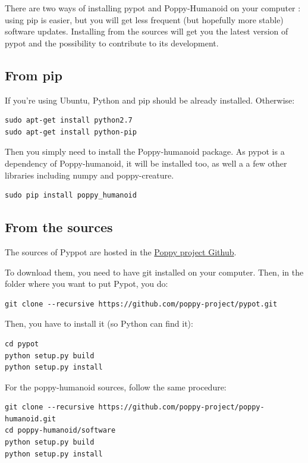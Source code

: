 \documentclass{article}
\begin{document}
There are two ways of installing pypot and Poppy-Humanoid on your computer : using pip is easier, but you will get less frequent (but hopefully more stable) software updates. Installing from the sources will get you the latest version of pypot and the possibility to contribute to its development.

\subsection{From pip}
If you're using Ubuntu, Python and pip should be already installed. Otherwise:
\begin{verbatim}
sudo apt-get install python2.7
sudo apt-get install python-pip
\end{verbatim}

Then you simply need to install the Poppy-humanoid package. As pypot is a dependency of Poppy-humanoid, it will be installed too, as well a a few other libraries including numpy and poppy-creature.

\begin{verbatim}
sudo pip install poppy_humanoid
\end{verbatim}

\subsection{From the sources}

The sources of Pyppot are hosted in the \href{https://github.com/poppy-project/pypot}{Poppy project Github}.

To download them, you need to have git installed on your computer. Then, in the folder where you want to put Pypot, you do:

\begin{verbatim}
git clone --recursive https://github.com/poppy-project/pypot.git
\end{verbatim}

Then, you have to install it (so Python can find it):

\begin{verbatim}
cd pypot
python setup.py build
python setup.py install
\end{verbatim}

For the poppy-humanoid sources, follow the same procedure:

\begin{verbatim}
git clone --recursive https://github.com/poppy-project/poppy-humanoid.git
cd poppy-humanoid/software
python setup.py build
python setup.py install
\end{verbatim}
\end{document}
